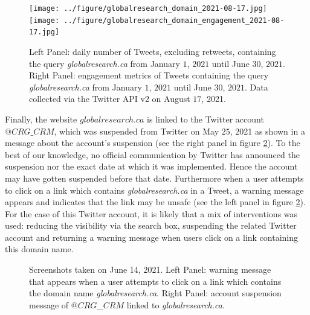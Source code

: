 \documentclass{article}
\begin{document}
\begin{figure}[h]
\centering
\hspace{-2em}
		\texttt{[image: ../figure/globalresearch\_domain\_2021-08-17.jpg]} 
		\texttt{[image: ../figure/globalresearch\_domain\_engagement\_2021-08-17.jpg]}
\caption{Left Panel: daily number of Tweets, excluding retweets, containing the query {\it globalresearch.ca} from January $1$, $2021$ until June $30$, $2021$. Right Panel: engagement metrics of Tweets containing the query {\it globalresearch.ca} from January $1$, $2021$ until June $30$, $2021$. Data collected via the Twitter API v2 on August $17$, 2021.   }
\label{fig4}
\end{figure}

Finally, the website $globalresearch.ca$ is linked to the Twitter account {$@CRG\_CRM$}, which was suspended from Twitter on May $25$, 2021 as shown in a message about the account's suspension (see the right panel in figure \ref{fig4bis}). To the best of our knowledge, no official communication by Twitter has announced the suspension nor the exact date at which it was implemented. Hence the account may have gotten suspended before that date. Furthermore when a user attempts to click on a link which contains {\it globalresearch.ca} in a Tweet, a warning message appears and indicates that the link may be unsafe (see the left panel in figure \ref{fig4bis}). For the case of this Twitter account, it is likely that a mix of interventions was used: reducing the visibility via the search box, suspending the related Twitter account and returning a warning message when users click on a link containing this domain name.  


\begin{figure}[h]
	\begin{center}
	\end{center}
	\caption{Screenshots taken on June 14, 2021. Left Panel: warning message that appears when a user attempts to click on a link which contains the domain name {\it globalresearch.ca}. Right Panel: account suspension message of $@CRG$\_$CRM$ linked to {\it globalresearch.ca}.  }
	\label{fig4bis}
\end{figure}

\end{document}
